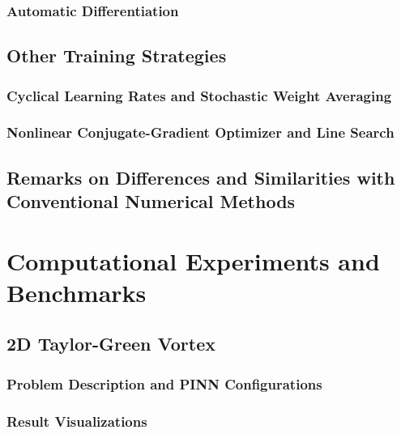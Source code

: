 \documentclass[font=STIX2]{gw-dissertation}[2021/11/19]
\begin{document}
        \subsection{Automatic Differentiation}\label{sec:ad}
        

    \section{Other Training Strategies}
    

        \subsection{Cyclical Learning Rates and Stochastic Weight Averaging}\label{sec:cyclic-swa}
        

        \subsection{Nonlinear Conjugate-Gradient Optimizer and Line Search}\label{sec:ncg}
        

    \section{Remarks on Differences and Similarities with Conventional Numerical Methods}\label{sec:pinn-diff}
    

\chapter{Computational Experiments and Benchmarks}\label{chap:pinn-cases}

    \section{2D Taylor-Green Vortex}\label{sec:pinn-2d-tgv}

        \subsection{Problem Description and PINN Configurations}
        \label{sec:pinn-2d-tgv-intro}
        

        \subsection{Result Visualizations}
        \label{sec:pinn-2d-tgv-vis}
        
\end{document}
